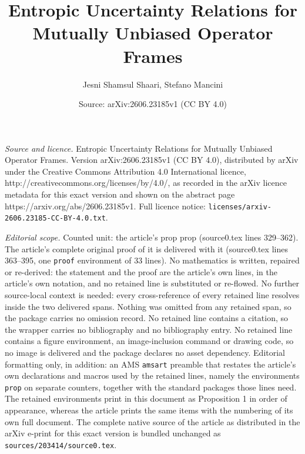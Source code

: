 \documentclass[10pt,a4paper]{amsart}
\title{Entropic Uncertainty Relations for Mutually Unbiased Operator Frames}
\author{Jesni Shamsul Shaari, Stefano Mancini}
\date{Source: arXiv:2606.23185v1 (CC BY 4.0)}
\begin{document}
\maketitle

\noindent\emph{Source and licence.} Entropic Uncertainty Relations for Mutually Unbiased Operator Frames. Version arXiv:2606.23185v1 (CC BY 4.0), distributed by arXiv under the Creative Commons Attribution 4.0 International licence, http://creativecommons.org/licenses/by/4.0/, as recorded in the arXiv licence metadata for this exact version and shown on the abstract page https://arxiv.org/abs/2606.23185v1. Full licence notice: \texttt{licenses/arxiv-2606.23185-CC-BY-4.0.txt}.\par\smallskip

\noindent\textit{Editorial scope.} Counted unit: the article's prop prop (source0.tex lines 329--362). The article's complete original proof of it is delivered with it (source0.tex lines 363--395, one \texttt{proof} environment of 33 lines). No mathematics is written, repaired or re-derived: the statement and the proof are the article's own lines, in the article's own notation, and no retained line is substituted or re-flowed.  No further source-local context is needed: every cross-reference of every retained line resolves inside the two delivered spans.  Nothing was omitted from any retained span, so the package carries no omission record.  No retained line contains a citation, so the wrapper carries no bibliography and no bibliography entry.  No retained line contains a figure environment, an image-inclusion command or drawing code, so no image is delivered and the package declares no asset dependency.  Editorial formatting only, in addition: an AMS \texttt{amsart} preamble that restates the article's own declarations and macros used by the retained lines, namely the environments \texttt{prop} on separate counters, together with the standard packages those lines need.  The retained environments print in this document as Proposition 1 in order of appearance, whereas the article prints the same items with the numbering of its own full document.  The complete native source of the article as distributed in the arXiv e-print for this exact version is bundled unchanged as \texttt{sources/203414/source0.tex}.
\end{document}
